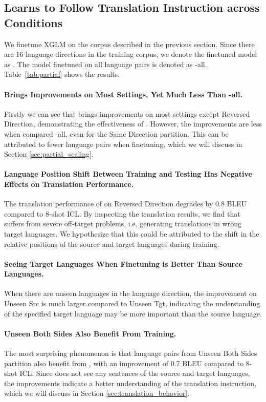 \subsection{\method Learns to Follow Translation Instruction across Conditions}
\label{sec:partial}

We finetune XGLM on the corpus described in the previous section. Since there are 16 language directions in the training corpus, we denote the finetuned model as . The model finetuned on all language pairs is denoted as \methodend-all. Table~\ref{tab:partial} shows the results.  

\paragraph{ Brings Improvements on Most Settings, Yet Much Less Than \methodend-all.}Firstly we can see that  brings improvements on most settings except Reversed Direction, demonstrating the effectiveness of . However, the improvements are less when compared \methodend-all, even for the Same Direction partition. This can be attributed to fewer language pairs when finetuning, which we will discuss in Section \ref{sec:partial_scaling}.

\paragraph{Language Position Shift Between Training and Testing Has Negative Effects on Translation Performance.}
The translation performance of  on Reversed Direction degrades by 0.8 BLEU compared to 8-shot ICL. By inspecting the translation results, we find that  suffers from severe off-target problems, i.e. generating translations in wrong target languages. We hypothesize that this could be attributed to the shift in the relative positions of the source and target languages during training.

\paragraph{Seeing Target Languages When Finetuning is Better Than Source Languages.}
When there are unseen languages in the language direction, the improvement on Unseen Src is much larger compared to Unseen Tgt, indicating the understanding of the specified target language may be more important than the source language.

\paragraph{Unseen Both Sides Also Benefit From \method Training.} The most surprising phenomenon is that language pairs from Unseen Both Sides partition also benefit from \methodend, with an improvement of 0.7 BLEU compared to 8-shot ICL. Since  does not see any sentences of the source and target languages, the improvements indicate a better understanding of the translation instruction, which we will discuss in Section \ref{sec:translation_behavior}.


